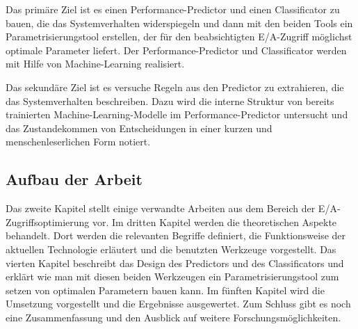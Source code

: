 Das primäre Ziel ist es einen Performance-Predictor und einen Classificator zu bauen, die das Systemverhalten widerspiegeln und dann mit den beiden Tools ein Parametrisierungstool erstellen, der für den beabsichtigten E/A-Zugriff möglichst optimale Parameter liefert. Der Performance-Predictor und Classificator werden mit Hilfe von Machine-Learning realisiert.

Das sekundäre Ziel ist es versuche Regeln aus den Predictor zu extrahieren, die das Systemverhalten beschreiben. Dazu wird die interne Struktur von bereits trainierten Machine-Learning-Modelle im Performance-Predictor untersucht und das Zustandekommen von Entscheidungen in einer kurzen und menschenleserlichen Form notiert.


\subsection{Aufbau der Arbeit}
Das zweite Kapitel stellt einige verwandte Arbeiten aus dem Bereich der E/A-Zugriffsoptimierung vor. Im dritten Kapitel werden die theoretischen Aspekte behandelt. Dort werden die relevanten Begriffe definiert, die Funktionsweise der aktuellen Technologie erläutert und die benutzten Werkzeuge vorgestellt. 
Das vierten Kapitel beschreibt das Design des Predictors und des Classificators und erklärt wie man mit diesen beiden Werkzeugen ein Parametrisierungstool zum setzen von optimalen Parametern bauen kann.
Im fünften Kapitel wird die Umsetzung vorgestellt und die Ergebnisse ausgewertet. Zum Schluss gibt es noch eine Zusammenfassung und den Ausblick auf weitere Forschungsmöglichkeiten.
